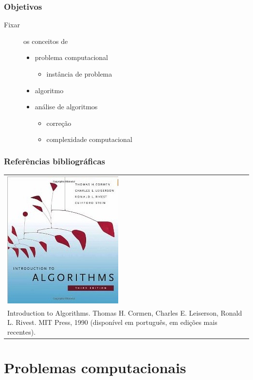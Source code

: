 \documentclass{beamer}
\begin{document}
\begin{frame}

  \frametitle{Objetivos}

  \begin{description}
  \item[Fixar] os conceitos de 
    \begin{itemize}
      \item problema computacional
        \begin{itemize}
          \item instância de problema
        \end{itemize}
      \item algoritmo
      \item análise de algoritmos
        \begin{itemize}
          \item correção
          \item complexidade computacional
        \end{itemize}
    \end{itemize}
  \end{description}

\end{frame}

\begin{frame}

  \frametitle{Referências bibliográficas}

  \begin{tabular}{p{}}
    \includegraphics[width=.35\textwidth]{img/cormen.jpg}
    \\
    Introduction to Algorithms. Thomas H. Cormen, Charles E. Leiserson, Ronald L. Rivest. MIT Press, 1990 (disponível em português, em edições mais recentes).
  \end{tabular}

\end{frame}

\section{Problemas computacionais}
\end{document}
